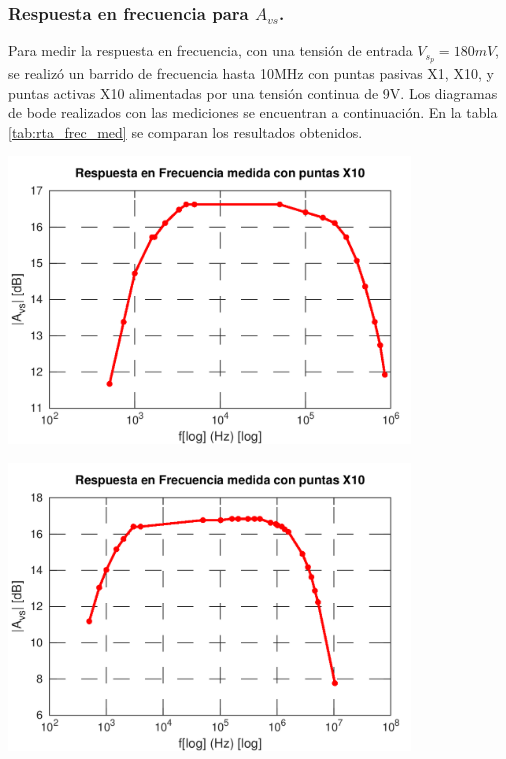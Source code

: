 \documentclass[a4paper, 10pt, spanish]{article}
\begin{document}
\subsubsection{Respuesta en frecuencia para $A_{vs}$.}
Para medir la respuesta en frecuencia, con una tensión de entrada $V_{s_p}=180mV$, se realizó un barrido de frecuencia hasta 10MHz con puntas pasivas X1, X10, y puntas activas X10 alimentadas por una tensión continua de 9V. Los diagramas de bode realizados con las mediciones se encuentran a continuación. En la tabla \ref{tab:rta_frec_med} se comparan los resultados obtenidos.

\begin{center}
  \includegraphics[width=0.8\textwidth]{X1.png}
  \label{fig:X1_med}
\end{center}

\begin{center}
  \includegraphics[width=0.8\textwidth]{X10.png}
  \label{fig:X10_med}
\end{center}
\end{document}

